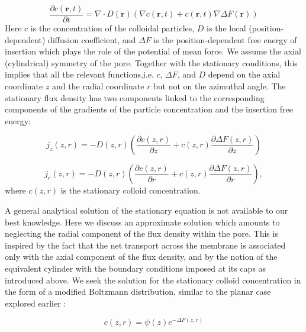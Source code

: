 \begin{equation}
    \frac{\partial c(\textbf{r},t)}{\partial t}=\nabla\cdotp D(\textbf{r})\left(\nabla c(\textbf{r},t)+c(\textbf{r},t)\nabla\Delta F(\textbf{r})\right)
    \label{eq:smoluchowsky}
\end{equation}
Here $c$ is the concentration of the colloidal particles, $D$ is the local (position-dependent) diffusion coefficient, and $\Delta F$ is the position-dependent free energy of insertion which plays the role of the potential of mean force.
We assume the axial (cylindrical) symmetry of the pore. Together with the stationary conditions, this implies that all the relevant functions,i.e. $c$, $\Delta F$, and $D$ depend on the axial coordinate $z$ and the radial coordinate $r$ but not on the azimuthal angle.
The stationary flux density has two components linked to the corresponding components of the gradients of the particle concentration and the insertion free energy:


\begin{equation}
j_{z}(z,r)=-D(z,r)\left(\frac{\partial c(z,r)}{\partial z}+c(z,r)\frac{\partial\Delta F(z,r)}{\partial z}\right)\label{eq:flux_axial}
\end{equation}

\begin{equation}
j_{r}(z,r)=-D(z,r)\left(\frac{\partial c(z,r)}{\partial r}+c(z,r)\frac{\partial\Delta F(z,r)}{\partial r}\right),
\label{eq:flux_radial}
\end{equation}
\noindent where $c(z,r)$ is the stationary colloid concentration.

A general analytical solution of the stationary equation is not available to our best knowledge. Here we discuss an approximate solution which amounts to neglecting the radial component of the flux density within the pore. This is inspired by the fact that the net transport across the membrane is associated only with the axial component of the flux density, and by the notion of the equivalent cylinder with the boundary conditions imposed at its caps as introduced above. 
We seek the solution for the stationary colloid concentration in the form of a modified Boltzmann distribution, similar to the planar case explored earlier \cite{Laktionov2023}:                                                         

\begin{equation}
c(z,r)=\psi(z)e^{-\Delta F(z,r)}\label{eq:stationary_c_ansatz}
\end{equation}

